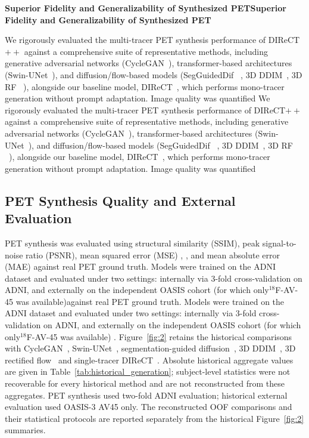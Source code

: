 \documentclass{article}
\providecommand{\DIFaddtex}[1]{{\protect\color{blue} \sf #1}} %
\providecommand{\DIFdeltex}[1]{{\protect\color{red} \ifmmode #1\else\scriptsize #1\fi}} %
\providecommand{\DIFaddbegin}{} %
\providecommand{\DIFaddend}{} %
\providecommand{\DIFdelbegin}{} %
\providecommand{\DIFdelend}{} %
\providecommand{\DIFadd}[1]{\texorpdfstring{\DIFaddtex{#1}}{#1}} %
\providecommand{\DIFdel}[1]{\texorpdfstring{\DIFdeltex{#1}}{}} %
\newcommand{\DIFscaledelfig}{0.5}
\newlength{\DIFdelgraphicswidth} %
\newlength{\DIFdelgraphicsheight} %
\newcommand{\DIFaddincludegraphics}[2][]{{\color{blue}\fbox{\DIFOincludegraphics[#1]{#2}}}} %
\newcommand{\DIFdelincludegraphics}[2][]{%
\sbox{\DIFdelgraphicsbox}{\DIFOincludegraphics[#1]{#2}}%
\settoboxwidth{\DIFdelgraphicswidth}{\DIFdelgraphicsbox} %
\settoboxtotalheight{\DIFdelgraphicsheight}{\DIFdelgraphicsbox} %
\scalebox{\DIFscaledelfig}{%
\parbox[b]{\DIFdelgraphicswidth}{\usebox{\DIFdelgraphicsbox}\\[-\baselineskip] \rule{\DIFdelgraphicswidth}{0em}}\llap{\resizebox{\DIFdelgraphicswidth}{\DIFdelgraphicsheight}{%
\setlength{\unitlength}{\DIFdelgraphicswidth}%
\begin{picture}(1,1)%
\thicklines\linethickness{2pt} %
{\color[rgb]{1,0,0}\put(0,0){\framebox(1,1){}}}%
{\color[rgb]{1,0,0}\put(0,0){\line( 1,1){1}}}%
{\color[rgb]{1,0,0}\put(0,1){\line(1,-1){1}}}%
\end{picture}%
}\hspace*{3pt}}} %
} %
\DeclareRobustCommand{\DIFaddbegin}{\DIFOaddbegin \let\includegraphics\DIFaddincludegraphics} %
\DeclareRobustCommand{\DIFaddend}{\DIFOaddend \let\includegraphics\DIFOincludegraphics} %
\DeclareRobustCommand{\DIFdelbegin}{\DIFOdelbegin \let\includegraphics\DIFdelincludegraphics} %
\DeclareRobustCommand{\DIFdelend}{\DIFOaddend \let\includegraphics\DIFOincludegraphics} %
\begin{document}
\DIFdelbegin \par\noindent\DIFdel{\textbf{Superior Fidelity and Generalizability of Synthesized PET}}\par
\DIFdel{We rigorously evaluated the multi-tracer PET synthesis performance of DIReCT$++$ against a comprehensive suite of representative methods, including generative adversarial networks (CycleGAN~\cite{zhu2017unpaired}), transformer-based architectures (Swin-UNet~\cite{Cao2021swin}), and diffusion/flow-based models (SegGuidedDif ~\cite{konz2024anatomically}, 3D DDIM~\cite{Graf2023}, 3D RF ~\cite{Xing2022}), alongside our baseline model, DIReCT~\cite{liu2025direct}, which performs mono-tracer generation without prompt adaptation. Image quality was quantified }\DIFdelend \DIFaddbegin \subsection{\texorpdfstring{\DIFadd{PET Synthesis Quality and External Evaluation}}{PET Synthesis Quality and External Evaluation}}
\DIFadd{PET synthesis was evaluated }\DIFaddend using structural similarity (SSIM), peak signal-to-noise ratio (PSNR), mean squared error (MSE) \DIFdelbegin \DIFdel{, }\DIFdelend and mean absolute error (MAE)\DIFdelbegin \DIFdel{against real PET ground truth. Models were trained on the ADNI dataset and evaluated under two settings: internally via 3-fold cross-validation on ADNI, and externally on the independent OASIS cohort (for which only$^{18}$F-AV-45 was available)}\DIFdelend \DIFaddbegin \DIFadd{. Figure~\ref{fig:2} retains the historical comparisons with CycleGAN~\cite{zhu2017unpaired}, Swin-UNet~\cite{Cao2021swin}, segmentation-guided diffusion~\cite{konz2024anatomically}, 3D DDIM~\cite{song2021ddim,pinaya2023generative}, 3D rectified flow~\cite{Xing2022} and single-tracer DIReCT~\cite{liu2025direct}. Absolute historical aggregate values are given in Table~\ref{tab:historical_generation}; subject-level statistics were not recoverable for every historical method and are not reconstructed from these aggregates.
PET synthesis used two-fold ADNI evaluation; historical external evaluation used OASIS-3 AV45 only. The reconstructed OOF comparisons and their statistical protocols are reported separately from the historical Figure~\ref{fig:2} summaries}\DIFaddend .
\end{document}
